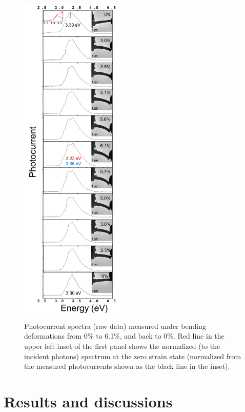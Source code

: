 \begin{figure}  
\includegraphics[width=150pt]{figures/figure5_2}
\centering
\caption[Splitting of photocurrent spectroscopy.]{Photocurrent spectra (raw data) measured under bending deformations from 0\% to 6.1\%, and back to 0\%. Red line in the upper left inset of the first panel shows the normalized (to the incident photons) spectrum at the zero strain state (normalized from the measured photocurrents shown as the black line in the inset).
\label{fig:5_2}}
\end{figure}

\section{Results and discussions}


